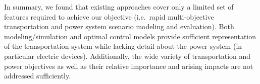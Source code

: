 In summary, we found that existing approaches cover only a limited set of features required to achieve our objective (i.e.\ rapid multi-objective transportation and power system scenario modeling and evaluation). Both modeling/simulation and optimal control models provide sufficient representation of the transportation system while lacking detail about the power system (in particular electric devices). Additionally, the wide variety of transportation and power objectives as well as their relative importance and arising impacts are not addressed sufficiently.